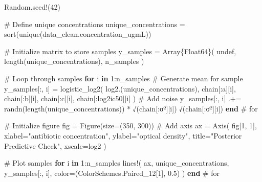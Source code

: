\documentclass[
]{scrartcl}
\newenvironment{Shaded}{\begin{snugshade}}{\end{snugshade}}
\newcommand{\BuiltInTok}[1]{\textcolor[rgb]{0.00,0.23,0.31}{#1}}
\newcommand{\CommentTok}[1]{\textcolor[rgb]{0.37,0.37,0.37}{#1}}
\newcommand{\ConstantTok}[1]{\textcolor[rgb]{0.56,0.35,0.01}{#1}}
\newcommand{\ControlFlowTok}[1]{\textcolor[rgb]{0.00,0.23,0.31}{\textbf{#1}}}
\newcommand{\DataTypeTok}[1]{\textcolor[rgb]{0.68,0.00,0.00}{#1}}
\newcommand{\FloatTok}[1]{\textcolor[rgb]{0.68,0.00,0.00}{#1}}
\newcommand{\FunctionTok}[1]{\textcolor[rgb]{0.28,0.35,0.67}{#1}}
\newcommand{\KeywordTok}[1]{\textcolor[rgb]{0.00,0.23,0.31}{\textbf{#1}}}
\newcommand{\NormalTok}[1]{\textcolor[rgb]{0.00,0.23,0.31}{#1}}
\newcommand{\OperatorTok}[1]{\textcolor[rgb]{0.37,0.37,0.37}{#1}}
\newcommand{\StringTok}[1]{\textcolor[rgb]{0.13,0.47,0.30}{#1}}
\begin{document}
\begin{Shaded}
\begin{Highlighting}[]
\BuiltInTok{Random}\NormalTok{.}\FunctionTok{seed!}\NormalTok{(}\FloatTok{42}\NormalTok{)}

\CommentTok{\# Define unique concentrations}
\NormalTok{unique\_concentrations }\OperatorTok{=} \FunctionTok{sort}\NormalTok{(}\FunctionTok{unique}\NormalTok{(data\_clean.concentration\_ugmL))}

\CommentTok{\# Initialize matrix to store samples}
\NormalTok{y\_samples }\OperatorTok{=} \FunctionTok{Array}\DataTypeTok{\{Float64\}}\NormalTok{(}
    \ConstantTok{undef}\NormalTok{, }\FunctionTok{length}\NormalTok{(unique\_concentrations), n\_samples}
\NormalTok{)}

\CommentTok{\# Loop through samples}
\ControlFlowTok{for}\NormalTok{ i }\KeywordTok{in} \FloatTok{1}\OperatorTok{:}\NormalTok{n\_samples}
    \CommentTok{\# Generate mean for sample}
\NormalTok{    y\_samples[}\OperatorTok{:}\NormalTok{, i] }\OperatorTok{=} \FunctionTok{logistic\_log2}\NormalTok{(}
        \FunctionTok{log2}\NormalTok{.(unique\_concentrations),}
\NormalTok{        chain[}\OperatorTok{:}\NormalTok{a][i],}
\NormalTok{        chain[}\OperatorTok{:}\NormalTok{b][i],}
\NormalTok{        chain[}\OperatorTok{:}\NormalTok{c][i],}
\NormalTok{        chain[}\OperatorTok{:}\NormalTok{log2ic50][i]}
\NormalTok{    )}
    \CommentTok{\# Add noise}
\NormalTok{    y\_samples[}\OperatorTok{:}\NormalTok{, i] }\OperatorTok{.+=} \FunctionTok{randn}\NormalTok{(}\FunctionTok{length}\NormalTok{(unique\_concentrations)) }\OperatorTok{*} \FunctionTok{√}\NormalTok{(chain[}\OperatorTok{:}\NormalTok{σ²][i])}
    \FunctionTok{√}\NormalTok{(chain[}\OperatorTok{:}\NormalTok{σ²][i])}
\ControlFlowTok{end} \CommentTok{\# for}

\CommentTok{\# Initialize figure}
\NormalTok{fig }\OperatorTok{=} \FunctionTok{Figure}\NormalTok{(size}\OperatorTok{=}\NormalTok{(}\FloatTok{350}\NormalTok{, }\FloatTok{300}\NormalTok{))}
\CommentTok{\# Add axis}
\NormalTok{ax }\OperatorTok{=} \FunctionTok{Axis}\NormalTok{(}
\NormalTok{    fig[}\FloatTok{1}\NormalTok{, }\FloatTok{1}\NormalTok{],}
\NormalTok{    xlabel}\OperatorTok{=}\StringTok{"antibiotic concentration"}\NormalTok{,}
\NormalTok{    ylabel}\OperatorTok{=}\StringTok{"optical density"}\NormalTok{,}
\NormalTok{    title}\OperatorTok{=}\StringTok{"Posterior Predictive Check"}\NormalTok{,}
\NormalTok{    xscale}\OperatorTok{=}\NormalTok{log2}
\NormalTok{)}

\CommentTok{\# Plot samples}
\ControlFlowTok{for}\NormalTok{ i }\KeywordTok{in} \FloatTok{1}\OperatorTok{:}\NormalTok{n\_samples}
    \FunctionTok{lines!}\NormalTok{(}
\NormalTok{        ax,}
\NormalTok{        unique\_concentrations,}
\NormalTok{        y\_samples[}\OperatorTok{:}\NormalTok{, i],}
\NormalTok{        color}\OperatorTok{=}\NormalTok{(ColorSchemes.Paired\_12[}\FloatTok{1}\NormalTok{], }\FloatTok{0.5}\NormalTok{)}
\NormalTok{    )}
\ControlFlowTok{end} \CommentTok{\# for}


\end{Highlighting}
\end{Shaded}
\end{document}
